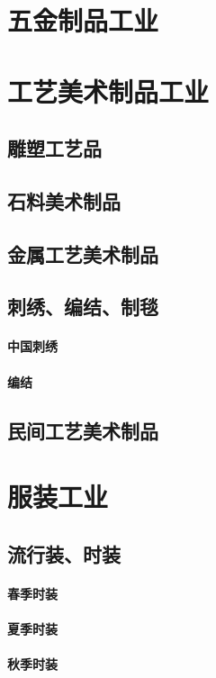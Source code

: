 \documentclass[UTF8]{../../ApplicationUniverse}
\begin{document}
\chapter{五金制品工业}

\chapter{工艺美术制品工业}
\section{雕塑工艺品}
\section{石料美术制品}
\section{金属工艺美术制品}
\section{刺绣、编结、制毯}
    \subsubsection{中国刺绣}
    \subsubsection{编结}
\section{民间工艺美术制品}

\chapter{服装工业}
\section{流行装、时装}
    \subsubsection{春季时装}
    \subsubsection{夏季时装}
    \subsubsection{秋季时装}
\end{document}
